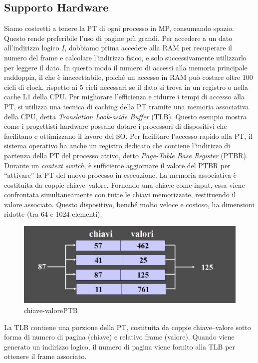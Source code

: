 \subsection{Supporto Hardware}
Siamo costretti a tenere la PT di ogni processo in MP, consumando spazio. Questo rende preferibile l'uso di pagine più grandi.
Per accedere a un dato all’indirizzo logico $I$, dobbiamo prima accedere alla RAM per recuperare il numero del frame e calcolare l’indirizzo fisico, e solo successivamente utilizzarlo per leggere il dato. In questo modo il numero di accessi alla memoria principale raddoppia, il che è inaccettabile, poiché un accesso in RAM può costare oltre 100 cicli di clock, rispetto ai 5 cicli necessari se il dato si trova in un registro o nella cache L1 della CPU.
Per migliorare l'efficienza e ridurre i tempi di accesso alla PT, si utilizza una tecnica di caching della PT tramite una memoria associativa della CPU, detta \emph{Translation Look-aside Buffer} (TLB). Questo esempio mostra come i progettisti hardware possano dotare i processori di dispositivi che facilitano e ottimizzano il lavoro del SO.
Per facilitare l’accesso rapido alla PT, il sistema operativo ha anche un registro dedicato che contiene l’indirizzo di partenza della PT del processo attivo, detto \emph{Page-Table Base Register} (PTBR). Durante un \emph{context switch}, è sufficiente aggiornare il valore del PTBR per “attivare” la PT del nuovo processo in esecuzione.
La memoria associativa è costituita da coppie chiave–valore. Fornendo una chiave come input, essa viene confrontata simultaneamente con tutte le chiavi memorizzate, restituendo il valore associato. Questo dispositivo, benché molto veloce e costoso, ha dimensioni ridotte (tra 64 e 1024 elementi).
\begin{figure}[h] \centering \includegraphics[width=0.50\linewidth]{images/chiave-valorePTB.png} \caption{chiave-valorePTB} \label{fig:9.9} \end{figure}

La TLB contiene una porzione della PT, costituita da coppie chiave–valore sotto forma di numero di pagina (chiave) e relativo frame (valore). Quando viene generato un indirizzo logico, il numero di pagina viene fornito alla TLB per ottenere il frame associato.


